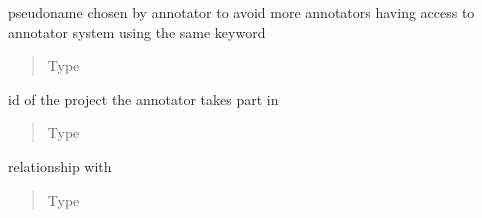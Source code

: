 \documentclass[a4paper,12pt,english]{sphinxmanual}
\begin{document}
\begin{fulllineitems}
\begin{fulllineitems}
\label{\detokenize{project_rst/models:project.models.Annotator.name}}
pseudoname chosen by annotator to
avoid more annotators having access to annotator system using the same keyword
\begin{quote}\begin{description}
\item[{Type}] \leavevmode
{}

\end{description}\end{quote}

\end{fulllineitems}


\begin{fulllineitems}
\label{\detokenize{project_rst/models:project.models.Annotator.project_id}}
id of the project
the annotator takes part in
\begin{quote}\begin{description}
\item[{Type}] \leavevmode
{}

\end{description}\end{quote}

\end{fulllineitems}


\begin{fulllineitems}
\label{\detokenize{project_rst/models:project.models.Annotator.project}}
relationship with {\hyperref[\detokenize{project_rst/models:project.models.Project}]{}}
\begin{quote}\begin{description}
\item[{Type}] \leavevmode
{}


\end{description}
\end{quote}
\end{fulllineitems}
\end{fulllineitems}
\end{document}
